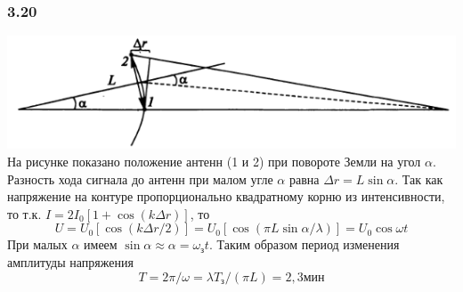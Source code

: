\subsubsection*{3.20}
\includegraphics{parts/img/3_20.png}
На рисунке показано положение антенн (1 и 2) при повороте Земли на угол $\alpha$. Разность хода сигнала до антенн при малом угле $\alpha$ равна $\Delta r = L \sin \alpha$. Так как напряжение на контуре пропорционально квадратному корню из интенсивности, то т.к. $I = 2I_0\left[ 1 + \cos (k \Delta r)\right] $, то
\begin{equation*}
	U= U_0 \left[ \cos (k \Delta r/2)\right]  = U_0\left[ \cos(\pi L \sin \alpha / \lambda)\right]  = U_0 \cos \omega t
\end{equation*}
При малых $\alpha$ имеем $\sin \alpha \approx \alpha = \omega_з t$. Таким образом период изменения амплитуды напряжения
\begin{equation*}
	T = 2\pi / \omega = \lambda T_з / (\pi L) = 2,3 мин
\end{equation*}